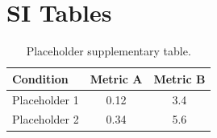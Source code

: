 \section{SI Tables}

\begin{table}[htbp]
  \centering
  \caption{Placeholder supplementary table.}
  \label{tab:ch2-si-table1}
  \begin{tabular}{lcc}
    \toprule
    Condition & Metric A & Metric B \\
    \midrule
    Placeholder 1 & 0.12 & 3.4 \\
    Placeholder 2 & 0.34 & 5.6 \\
    \bottomrule
  \end{tabular}
\end{table}
